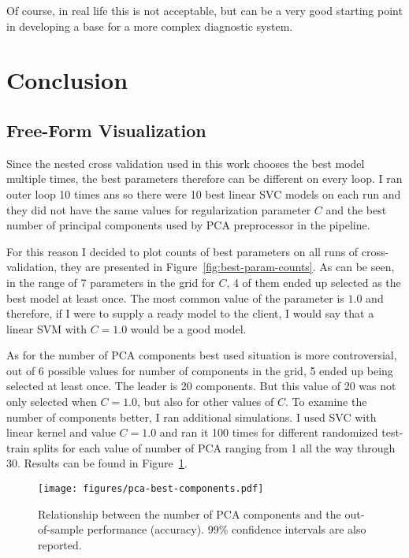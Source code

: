 \documentclass[10pt, a4paper]{article}
\begin{document}
Of course, in real life this is not acceptable, but can be a very good starting point in developing a base for a more complex diagnostic system.

\section{Conclusion}

\subsection{Free-Form Visualization}

Since the nested cross validation used in this work chooses the best model multiple times, the best parameters therefore can be different on every loop. I ran outer loop 10 times ans so there were 10 best linear SVC models on each run and they did not have the same values for regularization parameter $C$ and the best number of principal components used by PCA preprocessor in the pipeline.

For this reason I decided to plot counts of best parameters on all runs of cross-validation, they are presented in Figure~\ref{fig:best-param-counts}. As can be seen, in the range of 7 parameters in the grid for $C$, 4 of them ended up selected as the best model at least once. The most common value of the parameter is $1.0$ and therefore, if I were to supply a ready model to the client, I would say that a linear SVM with $C=1.0$ would be a good model.



As for the number of PCA components best used situation is more controversial, out of 6 possible values for number of components in the grid, 5 ended up being selected at least once. The leader is 20 components. But this value of 20 was not only selected when $C=1.0$, but also for other values of $C$. To examine the number of components better, I ran additional simulations. I used SVC with linear kernel and value $C=1.0$ and ran it 100 times for different randomized test-train splits for each value of number of PCA ranging from 1 all the way through 30. Results can be found in Figure~\ref{fig:pca-best-components}.

\begin{figure}[h!]
	\centering
	\texttt{[image: figures/pca-best-components.pdf]}\\
	\caption{Relationship between the number of PCA components and the out-of-sample performance (accuracy). 99\% confidence intervals are also reported.}
	\label{fig:pca-best-components}
\end{figure}
\end{document}
